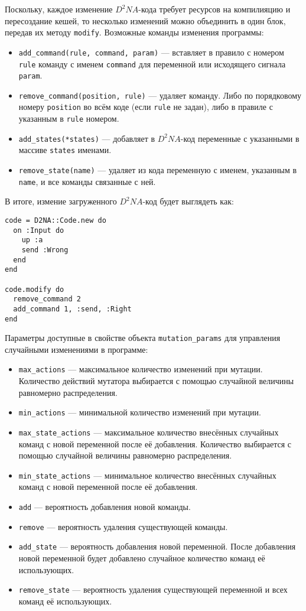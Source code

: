\documentclass[utf8,a5paper,portrait,10pt]{eskdtext}
\begin{document}
Поскольку, каждое изменение $D^2NA$-кода требует ресурсов на компилияцию и
пересоздание кешей, то несколько изменений можно объединить в один блок, передав
их методу \texttt{modify}. Возможные команды изменения программы:
\begin{itemize}
  \item \texttt{add\_command(rule, command, param)} — вставляет в
        правило с номером \texttt{rule} команду с именем
        \texttt{command} для переменной или исходящего сигнала
        \texttt{param}.
  \item \texttt{remove\_command(position, rule)} — удаляет команду. Либо по
        порядковому номеру \texttt{position} во всём коде (если \texttt{rule}
        не задан), либо в правиле с указанным в \texttt{rule} номером.
  \item \texttt{add\_states(*states)} — добавляет в $D^2NA$-код переменные с
        указанными в массиве \texttt{states} именами.
  \item \texttt{remove\_state(name)} — удаляет из кода переменную с именем,
        указанным в \texttt{name}, и все команды связанные с ней.
\end{itemize}

В итоге, измение загруженного $D^2NA$-код будет выглядеть как:
\begin{verbatim}
code = D2NA::Code.new do
  on :Input do
    up :a
    send :Wrong
  end
end

code.modify do
  remove_command 2
  add_command 1, :send, :Right
end
\end{verbatim}

Параметры доступные в свойстве объекта \texttt{mutation\_params} для управления
случайными изменениями в программе:

\begin{itemize}
  \item \texttt{max\_actions} — максимальное количество изменений при мутации.
        Количество действий мутатора выбирается с помощью случайной величины
        равномерно распределения.
  \item \texttt{min\_actions} — минимальной количество изменений при мутации.
  \item \texttt{max\_state\_actions} — максимальное количество внесённых
        случайных команд с новой переменной после её добавления. Количество
        выбирается с помощью случайной величины равномерно распределения.
  \item \texttt{min\_state\_actions} — минимальное количество внесённых
        случайных команд с новой переменной после её добавления.
  \item \texttt{add} — вероятность добавления новой команды.
  \item \texttt{remove} — вероятность удаления существующей команды.
  \item \texttt{add\_state} — вероятность добавления новой переменной. После
        добавления новой переменной будет добавлено случайное количество
        команд её использующих.
  \item \texttt{remove\_state} — вероятность удаления существующей переменной и
        всех команд её использующих.
\end{itemize}
\end{document}
